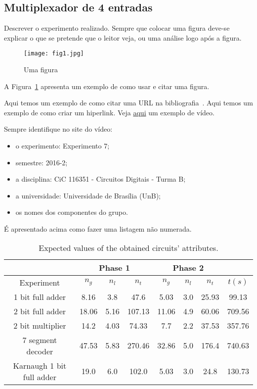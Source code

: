 \documentclass[12pt]{article}
\begin{document}
\subsection{Multiplexador de 4 entradas}
\label{sec:Mux}

Descrever o experimento realizado. Sempre  que colocar uma figura deve-se explicar o que se pretende que o leitor veja, ou uma análise logo após a figura. 

\begin{figure}[H]
\centering
\texttt{[image: fig1.jpg]}
\caption{Uma figura}
\label{fig:exemplo}
\end{figure}

A Figura~\ref{fig:exemplo} apresenta um exemplo de como usar e citar uma figura.

Aqui temos um exemplo de como citar uma URL na bibliografia~\cite{systemverilog}.
Aqui temos um exemplo de como criar um hiperlink. Veja
\href{https://www.youtube.com/watch?v=EcNxjxKRQ6E}{aqui} um exemplo de vídeo.

Sempre identifique no site do vídeo:
\begin{itemize}
    \item o experimento: Experimento 7;
    \item semestre: 2016-2;
    \item a disciplina: CiC 116351 - Circuitos Digitais - Turma B;
    \item a universidade: Universidade de Brasília (UnB);
    \item os nomes dos componentes do grupo.
\end{itemize}

É apresentado acima como fazer uma listagem não numerada.


\begin{table}[H]
    \centering
    \caption{Expected values of the obtained circuits' attributes.}
    \begin{tabular}{|c|c|c|c|c|c|c|c|}
    \cline{2-7}
    \multicolumn{1}{c}{} & \multicolumn{3}{|c|}{Phase 1} & \multicolumn{3}{c|}{Phase 2} & \multicolumn{1}{c}{} \\
    \hline
    Experiment & $n_g$ & $n_l$ & $n_t$ & $n_g$ & $n_l$ & $n_t$ & $t(s)$ \\
    \hline
    1 bit full adder & 8.16 & 3.8 & 47.6 & 5.03 & 3.0 & 25.93 & 99.13 \\
    2 bit full adder & 18.06 & 5.16 & 107.13 & 11.06 & 4.9 & 60.06 & 709.56 \\
    2 bit multiplier & 14.2 & 4.03 & 74.33 & 7.7 & 2.2 & 37.53 & 357.76 \\
    7 segment decoder & 47.53 & 5.83 & 270.46 & 32.86 & 5.0 & 176.4 & 740.63 \\
    Karnaugh 1 bit full adder & 19.0 & 6.0 & 102.0 & 5.03 & 3.0 & 24.8 & 130.73 \\
    \hline
    \end{tabular}
    \label{tab:resultados}
\end{table}
\end{document}
